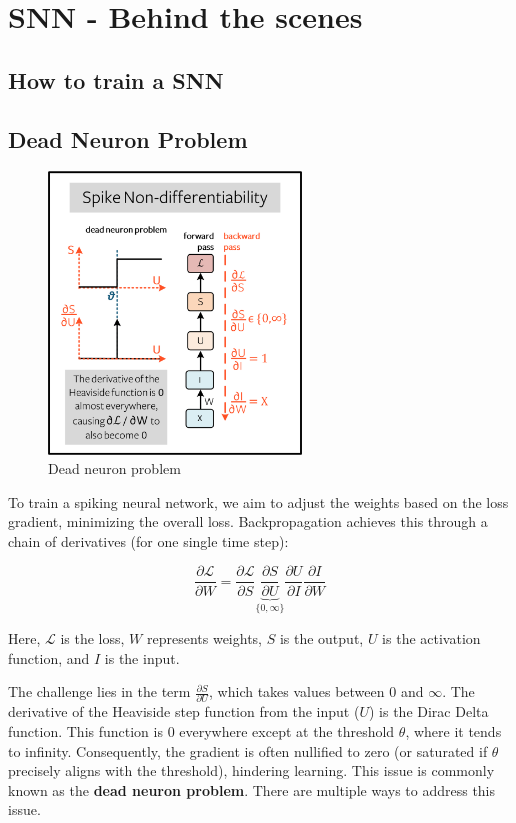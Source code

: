 \documentclass[11pt]{article}
\begin{document}
\pagebreak

\section{SNN - Behind the scenes}

\subsection{How to train a SNN}

\subsection{Dead Neuron Problem}

\begin{figure}
  \centering
  \includegraphics[width=0.6\textwidth]{./image/non-differentiability.png}
  \caption{Dead neuron problem\cite{eshraghian2021training}}
\end{figure}

To train a spiking neural network, we aim to adjust the weights based on the loss gradient, minimizing the overall loss. Backpropagation achieves this through a chain of derivatives (for one single time step):

$$
  \frac{\partial \mathcal{L}}{\partial W} =
  \frac{\partial \mathcal{L}}{\partial S}
  \underbrace{\frac{\partial S}{\partial U}}_{\{0, \infty\}}
  \frac{\partial U}{\partial I}
  \frac{\partial I}{\partial W}
$$

Here, $\mathcal{L}$ is the loss, $W$ represents weights, $S$ is the output, $U$ is the activation function, and $I$ is the input.

The challenge lies in the term $\frac{\partial S}{\partial U}$, which takes values between $0$ and $\infty$. The derivative of the Heaviside step function from the input ($U$) is the Dirac Delta function. This function is $0$ everywhere except at the threshold $\theta$, where it tends to infinity. Consequently, the gradient is often nullified to zero (or saturated if $\theta$ precisely aligns with the threshold), hindering learning. This issue is commonly known as the \textbf{dead neuron problem}. There are multiple ways to address this issue.
\end{document}
